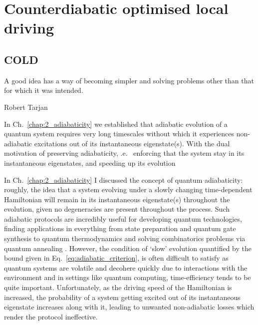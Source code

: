 \part{Counterdiabatic optimised local driving}

\chapter{COLD}\label{chap:4_COLD}

\epigraph{A good idea has a way of becoming simpler and solving problems other than that for which it was intended.}{Robert Tarjan}

In Ch.~\ref{chap:2_adiabaticity} we established that adiabatic evolution of a quantum system requires very long timescales without which it experiences non-adiabatic excitations out of its instantaneous eigenstate(s). With the dual motivation of preserving adiabaticity, \@i.e.~ enforcing that the system stay in its instantaneous eigenstates, and speeding up its evolution

\iffalse
In Ch.~\ref{chap:2_adiabaticity} I discussed the concept of quantum adiabaticity: roughly, the idea that a system evolving under a slowly changing time-dependent Hamiltonian will remain in its instantaneous eigenstate(s) throughout the evolution, given no degeneracies are present throughout the process. Such adiabatic protocols are incredibly useful for developing quantum technologies, finding applications in everything from state preparation \cite{dimitrova_many-body_2023} and quantum gate synthesis \cite{pelegri_high-fidelity_2022} to quantum thermodynamics\cite{campo_more_2014} and solving combinatorics problems via quantum annealing \cite{ebadi_quantum_2022}. However, the condition of `slow' evolution quantified by the bound given in Eq.~\eqref{eq:adiabatic_criterion}, is often difficult to satisfy as quantum systems are volatile and decohere quickly due to interactions with the environment and in settings like quantum computing, time-efficiency tends to be quite important. Unfortunately, as the driving speed of the Hamiltonian is increased, the probability of a system getting excited out of its instantaneous eigenstate increases along with it, leading to unwanted non-adiabatic losses which render the protocol ineffective. 

